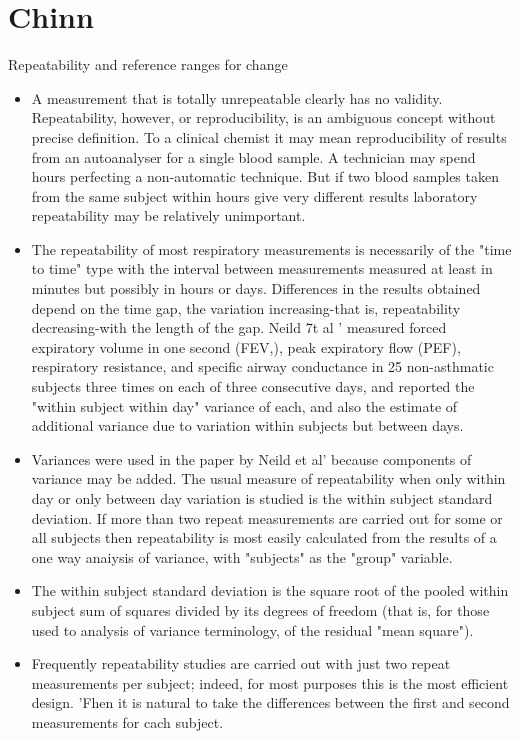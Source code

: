 \documentclass[MAIN.tex]{subfiles}
\begin{document}
\section*{Chinn}
Repeatability and reference ranges for
change
\begin{itemize}
\item A measurement that is totally unrepeatable clearly has no validity. Repeatability,
however, or reproducibility, is an ambiguous concept without precise definition. To a clinical
chemist it may mean reproducibility of results from an autoanalyser for a single blood
sample. A technician may spend hours perfecting a non-automatic technique. But if two
blood samples taken from the same subject within hours give very different results
laboratory repeatability may be relatively unimportant.


\item The repeatability of most respiratory measurements is necessarily of the "time to time" type with the interval between measurements measured at least in minutes but possibly in hours or days. Differences in the results obtained depend on the time gap,
the variation increasing-that is, repeatability decreasing-with the length of the gap. Neild
7t al ' measured forced expiratory volume in one second (FEV,), peak expiratory flow (PEF), respiratory resistance, and specific airway conductance in 25 non-asthmatic subjects
three times on each of three consecutive days, and reported the "within subject within day"
variance of each, and also the estimate of additional variance due to variation within
subjects but between days.

\item Variances were used in the paper by Neild et al' because components of variance may be
added. The usual measure of repeatability when only within day or only between day
variation is studied is the within subject standard
deviation. If more than two repeat
measurements are carried out for some or all
subjects then repeatability is most easily calculated
from the results of a one way anaiysis
of variance, with "subjects" as the "group"
variable. 
\item The within subject standard deviation
is the square root of the pooled within
subject sum of squares divided by its degrees
of freedom (that is, for those used to analysis
of variance terminology, of the residual "mean
square").
\item 
Frequently repeatability studies are carried
out with just two repeat measurements per
subject; indeed, for most purposes this is the
most efficient design. 'Fhen it is natural to take
the differences between the first and second measurements for cach subject. 


\end{itemize}
\end{document}
